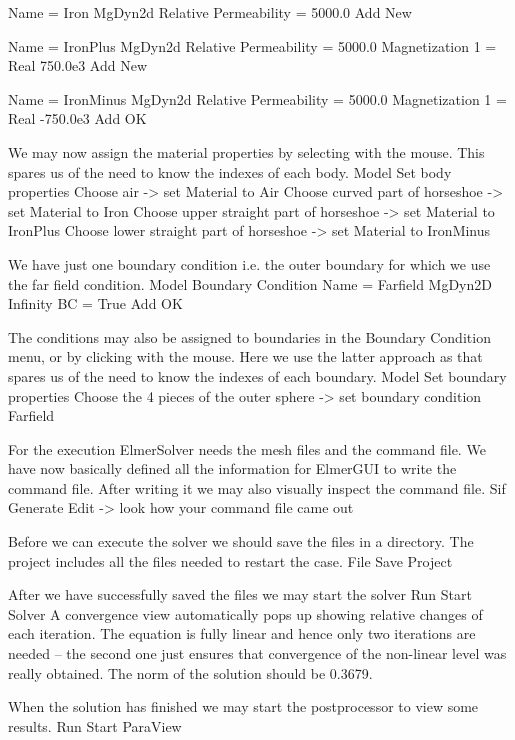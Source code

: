     Name = Iron
    MgDyn2d
      Relative Permeability = 5000.0
    Add
    New

    Name = IronPlus
    MgDyn2d
      Relative Permeability = 5000.0
      Magnetization 1 = Real 750.0e3
    Add
    New

    Name = IronMinus
    MgDyn2d
      Relative Permeability = 5000.0
      Magnetization 1 = Real -750.0e3
    Add
    OK
\ttend

We may now assign the material properties by selecting with the mouse.
This spares us of the 
need to know the indexes of each body.
\ttbegin
Model
  Set body properties
    Choose air -> set Material to Air
    Choose curved part of horseshoe -> set Material to Iron
    Choose upper straight part of horseshoe -> set Material to IronPlus
    Choose lower straight part of horseshoe -> set Material to IronMinus
\ttend

We have just one boundary condition i.e. the outer boundary for which we use the far field condition.
\ttbegin
Model
  Boundary Condition
    Name = Farfield
    MgDyn2D
      Infinity BC = True
    Add
    OK
\ttend   

The conditions may also be assigned to boundaries in the Boundary Condition menu, or
by clicking with the mouse. Here we use the latter approach as that spares us of the 
need to know the indexes of each boundary.
\ttbegin
Model
  Set boundary properties
    Choose the 4 pieces of the outer sphere -> set boundary condition Farfield
\ttend

For the execution 
ElmerSolver needs the mesh files and the command file. We have now basically defined
all the information for ElmerGUI to write the command file. After writing it we may also visually 
inspect the command file.
\ttbegin
Sif 
  Generate
  Edit -> look how your command file came out  
\ttend

Before we can execute the solver we should save the files in a directory. The project includes
all the files needed to restart the case.
\ttbegin
File 
  Save Project
\ttend

After we have successfully saved the files we may start the solver
\ttbegin
Run
  Start Solver
\ttend
A convergence view automatically pops up showing relative changes of each iteration.
The equation is fully linear and hence only two iterations are needed -- the second 
one just ensures that convergence of the non-linear level was really obtained. 
The norm of the solution should be 0.3679.

When the solution has finished we may start the postprocessor to view some results.
\ttbegin
Run
  Start ParaView
\ttend


